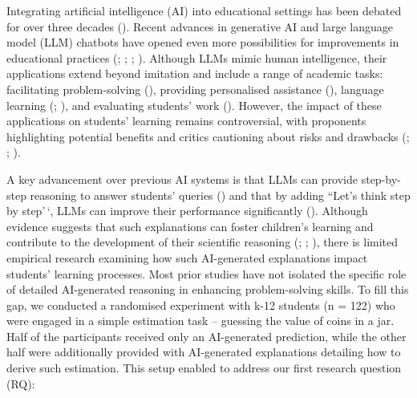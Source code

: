 \documentclass[
  12pt,
]{article}
\begin{document}
Integrating artificial intelligence (AI) into educational settings has been debated for over three decades (). Recent advances in generative AI and large language model (LLM) chatbots have opened even more possibilities for improvements in educational practices (; ; ; ). Although LLMs mimic human intelligence, their applications extend beyond imitation and include a range of academic tasks: facilitating problem-solving (), providing personalised assistance (), language learning (; ), and evaluating students' work (). However, the impact of these applications on students' learning remains controversial, with proponents highlighting potential benefits and critics cautioning about risks and drawbacks (; ; ).

A key advancement over previous AI systems is that LLMs can provide step-by-step reasoning to answer students' queries () and that by adding ``Let's think step by step'\,`, LLMs can improve their performance significantly (). Although evidence suggests that such explanations can foster children's learning and contribute to the development of their scientific reasoning (; ; ), there is limited empirical research examining how such AI-generated explanations impact students' learning processes. Most prior studies have not isolated the specific role of detailed AI-generated reasoning in enhancing problem-solving skills. To fill this gap, we conducted a randomised experiment with k-12 students (n = 122) who were engaged in a simple estimation task -- guessing the value of coins in a jar. Half of the participants received only an AI-generated prediction, while the other half were additionally provided with AI-generated explanations detailing how to derive such estimation. This setup enabled to address our first research question (RQ):
\end{document}
